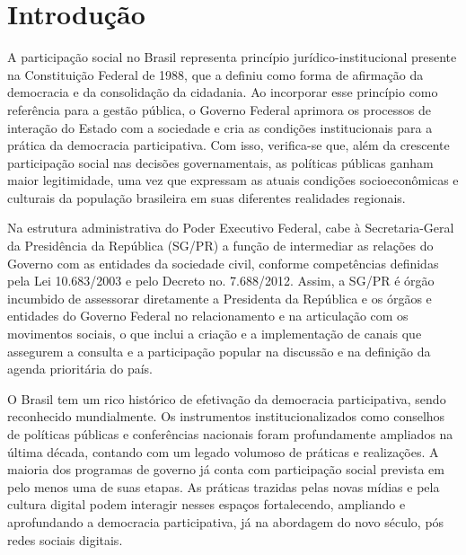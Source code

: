 \documentclass[[a4paper,11pt]{article}
\begin{document}
\lstset{language=Ruby}


\clearpage

\clearpage

\tableofcontents
\clearpage
\listoffigures

\clearpage

\section{Introdução}

A participação social no Brasil representa princípio
jurídico-institucional
presente na Constituição Federal de 1988, que a definiu como forma de
afirmação da
democracia e da consolidação da cidadania. Ao incorporar esse princípio
como
referência para a gestão pública, o Governo Federal aprimora os
processos de interação
do Estado com a sociedade e cria as condições institucionais para a
prática da
democracia participativa. Com isso, verifica-se que, além da crescente
participação
social nas decisões governamentais, as políticas públicas ganham maior
legitimidade,
uma vez que expressam as atuais condições socioeconômicas e culturais da
população
brasileira em suas diferentes realidades regionais.

Na estrutura administrativa do Poder Executivo Federal, cabe à
Secretaria-Geral
da Presidência da República (SG/PR) a função de intermediar as relações
do Governo
com as entidades da sociedade civil, conforme competências definidas
pela Lei
10.683/2003 e pelo Decreto no. 7.688/2012. Assim, a SG/PR é órgão
incumbido de
assessorar diretamente a Presidenta da República e os órgãos e entidades
do Governo
Federal no relacionamento e na articulação com os movimentos sociais, o
que inclui a
criação e a implementação de canais que assegurem a consulta e a
participação popular
na discussão e na definição da agenda prioritária do país.

O Brasil tem um rico histórico de efetivação da democracia
participativa, sendo
reconhecido mundialmente. Os instrumentos institucionalizados como
conselhos de
políticas públicas e conferências nacionais foram profundamente
ampliados na última
década, contando com um legado volumoso de práticas e realizações. A
maioria dos
programas de governo já conta com participação social prevista em pelo
menos uma de
suas etapas. As práticas trazidas pelas novas mídias e pela cultura
digital podem
interagir nesses espaços fortalecendo, ampliando e aprofundando a
democracia
participativa, já na abordagem do novo século, pós redes sociais
digitais.
\end{document}

